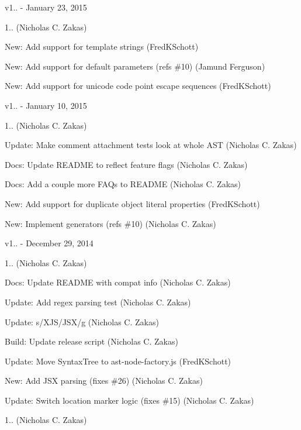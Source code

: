 v1.. -\/ January 23, 2015


\begin{DoxyItemize}
\item 1.. (Nicholas C. Zakas)
\item New\+: Add support for template strings (Fred\+KSchott)
\item New\+: Add support for default parameters (refs \#10) (Jamund Ferguson)
\item New\+: Add support for unicode code point escape sequences (Fred\+KSchott)
\end{DoxyItemize}

v1.. -\/ January 10, 2015


\begin{DoxyItemize}
\item 1.. (Nicholas C. Zakas)
\item Update\+: Make comment attachment tests look at whole AST (Nicholas C. Zakas)
\item Docs\+: Update README to reflect feature flags (Nicholas C. Zakas)
\item Docs\+: Add a couple more FAQs to README (Nicholas C. Zakas)
\item New\+: Add support for duplicate object literal properties (Fred\+KSchott)
\item New\+: Implement generators (refs \#10) (Nicholas C. Zakas)
\end{DoxyItemize}

v1.. -\/ December 29, 2014


\begin{DoxyItemize}
\item 1.. (Nicholas C. Zakas)
\item Docs\+: Update README with compat info (Nicholas C. Zakas)
\item Update\+: Add regex parsing test (Nicholas C. Zakas)
\item Update\+: s/\+XJS/\+JSX/g (Nicholas C. Zakas)
\item Build\+: Update release script (Nicholas C. Zakas)
\item Update\+: Move Syntax\+Tree to ast-\/node-\/factory.\+js (Fred\+KSchott)
\item New\+: Add JSX parsing (fixes \#26) (Nicholas C. Zakas)
\item Update\+: Switch location marker logic (fixes \#15) (Nicholas C. Zakas)
\item 1.. (Nicholas C. Zakas)
\end{DoxyItemize}

